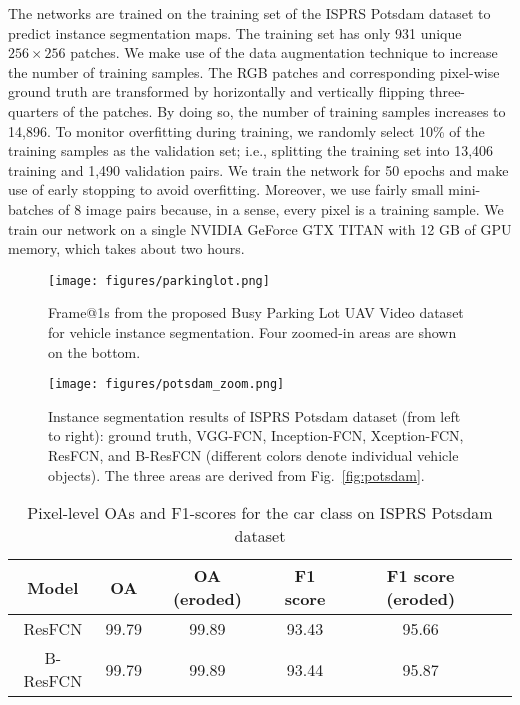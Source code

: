 \documentclass[journal]{IEEEtran}
\newcommand{\RR}[2]{\textcolor[rgb]{0,0,0}
{#2}}
\begin{document}
\par
The networks are trained on the training set of the ISPRS Potsdam dataset to predict instance segmentation maps. The training set has only 931 unique $256\times256$ patches. We make use of the data augmentation technique to increase the number of training samples. The RGB patches and corresponding pixel-wise ground truth are transformed by horizontally and vertically flipping three-quarters of the patches. By doing so, the number of training samples increases to 14,896. To monitor overfitting during training, we randomly select 10\% of the training samples as the validation set; i.e., splitting the training set into 13,406 training and 1,490 validation pairs. We train the network for 50 epochs and make use of early stopping to avoid overfitting. Moreover, we use fairly small mini-batches of 8 image pairs because, in a sense, every pixel is a training sample. We train our network on a single NVIDIA GeForce GTX TITAN with 12 GB of GPU memory, which takes about two hours.

\begin{figure}[t]
\centering
\texttt{[image: figures/parkinglot.png]}
\renewcommand{\figurename}{Fig}
\caption{\label{fig:parkinglot} Frame@1s from the proposed Busy Parking Lot UAV Video dataset for vehicle instance segmentation. Four zoomed-in areas are shown on the bottom.}
\end{figure}

\begin{figure*}[t]
\centering
\texttt{[image: figures/potsdam\_zoom.png]}
\renewcommand{\figurename}{Fig}
\caption{\label{fig:potsdam_zoom} Instance segmentation results of ISPRS Potsdam dataset (from left to right): ground truth, VGG-FCN, Inception-FCN, Xception-FCN, ResFCN, and B-ResFCN (different colors denote individual vehicle objects). The three areas are derived from Fig.~\ref{fig:potsdam}.}
\end{figure*}


\begin{table}[t]
\caption{\label{tab:oa} \RR{}{Pixel-level OAs and F1-scores for the car class} on ISPRS Potsdam dataset}
\centering
\begin{tabular}{cccccc}
\toprule
\textbf{Model} & \textbf{OA} & \textbf{OA (eroded)} & \textbf{F1 score} & \textbf{F1 score (eroded)} \\
\hline
ResFCN & 99.79 & 99.89 & 93.43 & 95.66 \\
B-ResFCN & 99.79 & 99.89 & 93.44 & 95.87 \\
\bottomrule
\end{tabular}
\end{table}
\end{document}
